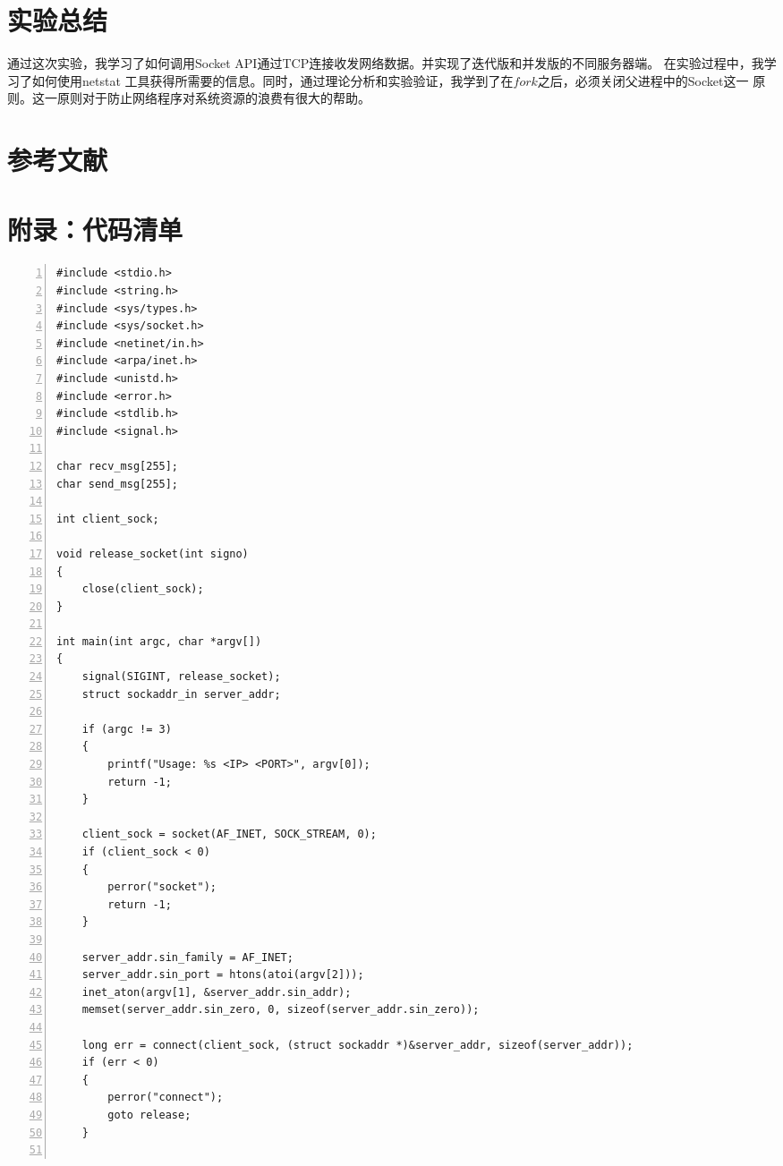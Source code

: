 \documentclass[a4paper,twoside]{article}
\begin{document}
\begin{spacing}{1.2}
\section{实验总结}

通过这次实验，我学习了如何调用Socket API通过TCP连接收发网络数据。并实现了迭代版和并发版的不同服务器端。
在实验过程中，我学习了如何使用netstat
工具获得所需要的信息。同时，通过理论分析和实验验证，我学到了在$fork$之后，必须关闭父进程中的Socket这一
原则。这一原则对于防止网络程序对系统资源的浪费有很大的帮助。

\appendix
\clearpage
\section*{参考文献}




\clearpage
\section*{附录：代码清单}
\label{sec:code}

\begin{lstlisting}[numbers=left,style=CppStyle,caption=客户机,label={code:client}]
#include <stdio.h>
#include <string.h>
#include <sys/types.h>
#include <sys/socket.h>
#include <netinet/in.h>
#include <arpa/inet.h>
#include <unistd.h>
#include <error.h>
#include <stdlib.h>
#include <signal.h>

char recv_msg[255];
char send_msg[255];

int client_sock;

void release_socket(int signo)
{
	close(client_sock);
}

int main(int argc, char *argv[])
{
	signal(SIGINT, release_socket);
	struct sockaddr_in server_addr;

	if (argc != 3)
	{
		printf("Usage: %s <IP> <PORT>", argv[0]);
		return -1;
	}

	client_sock = socket(AF_INET, SOCK_STREAM, 0);
	if (client_sock < 0)
	{
		perror("socket");
		return -1;
	}

	server_addr.sin_family = AF_INET;
	server_addr.sin_port = htons(atoi(argv[2]));
	inet_aton(argv[1], &server_addr.sin_addr);
	memset(server_addr.sin_zero, 0, sizeof(server_addr.sin_zero)); 

	long err = connect(client_sock, (struct sockaddr *)&server_addr, sizeof(server_addr));
	if (err < 0)
	{
		perror("connect");
		goto release;
	}


\end{lstlisting}
\end{spacing}
\end{document}
